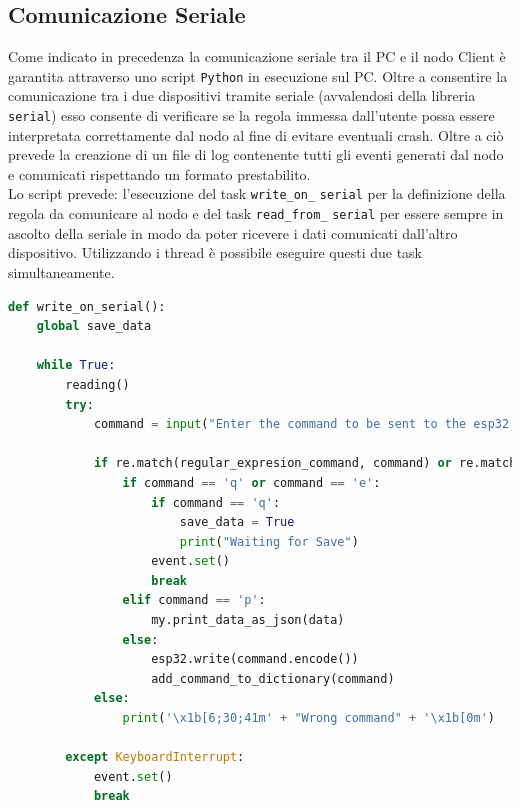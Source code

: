 \subsection{Comunicazione Seriale}
\label{sub:comunicazione_seriale}
Come indicato in precedenza la comunicazione seriale tra il PC e il nodo Client è garantita attraverso uno script \texttt{Python} in esecuzione sul PC. Oltre a consentire la comunicazione tra i due dispositivi tramite seriale (avvalendosi della libreria \texttt{serial}) esso consente di verificare se la regola immessa dall'utente possa essere interpretata correttamente dal nodo al fine di evitare eventuali crash. Oltre a ciò prevede la creazione di un file di log contenente tutti gli eventi generati dal nodo e comunicati rispettando un formato prestabilito.\\

\noindent Lo script prevede: l'esecuzione del task \texttt{write\_on\_} \texttt{serial} per la definizione della regola da comunicare al nodo e del task \texttt{read\_from\_} \texttt{serial} per essere sempre in ascolto della seriale in modo da poter ricevere i dati comunicati dall'altro dispositivo. Utilizzando i thread è possibile eseguire questi due task simultaneamente.

\begin{lstlisting}[language=Python, caption= scrittura su porta seriale e validazione input]
def write_on_serial():
    global save_data

    while True:
        reading()
        try:
            command = input("Enter the command to be sent to the esp32: \n")

            if re.match(regular_expresion_command, command) or re.match(regular_expresion_set_get, command) or re.match(regular_expresion_rule, command) or re.match(regular_expresion_wifi, command):
                if command == 'q' or command == 'e':
                    if command == 'q':
                        save_data = True
                        print("Waiting for Save")
                    event.set()
                    break
                elif command == 'p':
                    my.print_data_as_json(data)
                else:
                    esp32.write(command.encode())
                    add_command_to_dictionary(command)
            else:
                print('\x1b[6;30;41m' + "Wrong command" + '\x1b[0m')

        except KeyboardInterrupt:
            event.set()
            break
\end{lstlisting}

